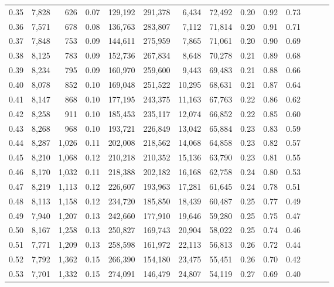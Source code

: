 \begin{tabular}{rrrrrrrrrrrrrr}
0.35 &  7,828 &    626 &  0.07 &  129,192 &  291,378 &   6,434 &  72,492 &  0.20 &  0.92 &      0.73 \\
0.36 &  7,571 &    678 &  0.08 &  136,763 &  283,807 &   7,112 &  71,814 &  0.20 &  0.91 &      0.71 \\
0.37 &  7,848 &    753 &  0.09 &  144,611 &  275,959 &   7,865 &  71,061 &  0.20 &  0.90 &      0.69 \\
0.38 &  8,125 &    783 &  0.09 &  152,736 &  267,834 &   8,648 &  70,278 &  0.21 &  0.89 &      0.68 \\
0.39 &  8,234 &    795 &  0.09 &  160,970 &  259,600 &   9,443 &  69,483 &  0.21 &  0.88 &      0.66 \\
0.40 &  8,078 &    852 &  0.10 &  169,048 &  251,522 &  10,295 &  68,631 &  0.21 &  0.87 &      0.64 \\
0.41 &  8,147 &    868 &  0.10 &  177,195 &  243,375 &  11,163 &  67,763 &  0.22 &  0.86 &      0.62 \\
0.42 &  8,258 &    911 &  0.10 &  185,453 &  235,117 &  12,074 &  66,852 &  0.22 &  0.85 &      0.60 \\
0.43 &  8,268 &    968 &  0.10 &  193,721 &  226,849 &  13,042 &  65,884 &  0.23 &  0.83 &      0.59 \\
0.44 &  8,287 &  1,026 &  0.11 &  202,008 &  218,562 &  14,068 &  64,858 &  0.23 &  0.82 &      0.57 \\
0.45 &  8,210 &  1,068 &  0.12 &  210,218 &  210,352 &  15,136 &  63,790 &  0.23 &  0.81 &      0.55 \\
0.46 &  8,170 &  1,032 &  0.11 &  218,388 &  202,182 &  16,168 &  62,758 &  0.24 &  0.80 &      0.53 \\
0.47 &  8,219 &  1,113 &  0.12 &  226,607 &  193,963 &  17,281 &  61,645 &  0.24 &  0.78 &      0.51 \\
0.48 &  8,113 &  1,158 &  0.12 &  234,720 &  185,850 &  18,439 &  60,487 &  0.25 &  0.77 &      0.49 \\
0.49 &  7,940 &  1,207 &  0.13 &  242,660 &  177,910 &  19,646 &  59,280 &  0.25 &  0.75 &      0.47 \\
0.50 &  8,167 &  1,258 &  0.13 &  250,827 &  169,743 &  20,904 &  58,022 &  0.25 &  0.74 &      0.46 \\
0.51 &  7,771 &  1,209 &  0.13 &  258,598 &  161,972 &  22,113 &  56,813 &  0.26 &  0.72 &      0.44 \\
0.52 &  7,792 &  1,362 &  0.15 &  266,390 &  154,180 &  23,475 &  55,451 &  0.26 &  0.70 &      0.42 \\
0.53 &  7,701 &  1,332 &  0.15 &  274,091 &  146,479 &  24,807 &  54,119 &  0.27 &  0.69 &      0.40 \\

\end{tabular}
